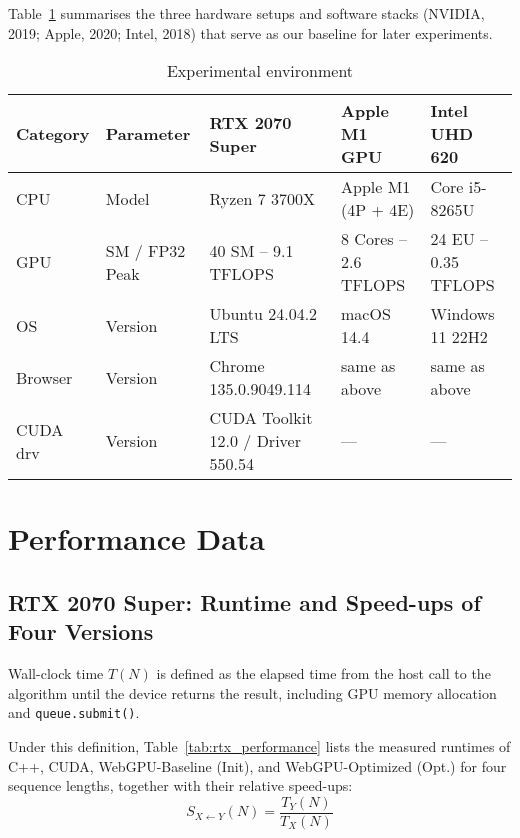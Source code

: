 \documentclass[PhD]{PHlab-thesis}
\begin{document}
Table~\ref{tab:exp_env} summarises the three hardware setups and software stacks (NVIDIA, 2019; Apple, 2020; Intel, 2018) that serve as our baseline for later experiments.


\begin{table}[htbp]
  \centering
  \caption{Experimental environment}
  \label{tab:exp_env}
  \setlength{\tabcolsep}{8pt}
  \renewcommand{\arraystretch}{1.4}
  \begin{tabularx}{\textwidth}{@{}lX X X X@{}}
    \toprule
    Category & Parameter & RTX 2070 Super & Apple M1 GPU & Intel UHD 620 \\
    \midrule
    CPU      & Model                 & Ryzen 7 3700X        & Apple M1 (4P + 4E) & Core i5-8265U \\
    GPU      & SM / FP32 Peak        & 40 SM – 9.1 TFLOPS   & 8 Cores – 2.6 TFLOPS & 24 EU – 0.35 TFLOPS \\
    OS       & Version               & Ubuntu 24.04.2 LTS   & macOS 14.4           & Windows 11 22H2 \\
    Browser  & Version               & Chrome 135.0.9049.114 & same as above        & same as above \\
    CUDA drv & Version               & CUDA Toolkit 12.0 / Driver 550.54 & — & — \\
    \bottomrule
  \end{tabularx}
\end{table}

\section{Performance Data}
\subsection{RTX 2070 Super: Runtime and Speed-ups of Four Versions}
Wall-clock time $T(N)$ is defined as the elapsed time from the host call to the algorithm until the device returns the result, including GPU memory allocation and \texttt{queue.submit()}.

Under this definition, Table~\ref{tab:rtx_performance} lists the measured runtimes of C++, CUDA, WebGPU-Baseline (Init), and WebGPU-Optimized (Opt.) for four sequence lengths, together with their relative speed-ups:
\[
S_{X \leftarrow Y}(N) = \frac{T_Y(N)}{T_X(N)}
\]
\end{document}
